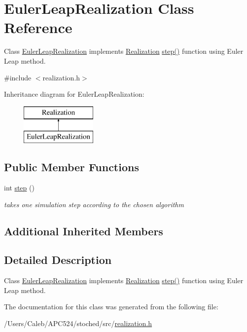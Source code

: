 \hypertarget{class_euler_leap_realization}{}\section{Euler\+Leap\+Realization Class Reference}
\label{class_euler_leap_realization}


Class \hyperlink{class_euler_leap_realization}{Euler\+Leap\+Realization} implements \hyperlink{class_realization}{Realization} \hyperlink{class_euler_leap_realization_ab72bfdc22d6101f2c10227b27a5121f1}{step()} function using Euler Leap method.  




{\ttfamily \#include $<$realization.\+h$>$}

Inheritance diagram for Euler\+Leap\+Realization\+:\begin{figure}[H]
\begin{center}
\leavevmode
\includegraphics[height=2.000000cm]{class_euler_leap_realization}
\end{center}
\end{figure}
\subsection*{Public Member Functions}
\begin{DoxyCompactItemize}
\item 
\mbox{\label{class_euler_leap_realization_ab72bfdc22d6101f2c10227b27a5121f1}} 
int \hyperlink{class_euler_leap_realization_ab72bfdc22d6101f2c10227b27a5121f1}{step} ()
\begin{DoxyCompactList}\small\item\em takes one simulation step according to the chosen algorithm \end{DoxyCompactList}\end{DoxyCompactItemize}
\subsection*{Additional Inherited Members}


\subsection{Detailed Description}
Class \hyperlink{class_euler_leap_realization}{Euler\+Leap\+Realization} implements \hyperlink{class_realization}{Realization} \hyperlink{class_euler_leap_realization_ab72bfdc22d6101f2c10227b27a5121f1}{step()} function using Euler Leap method. 

The documentation for this class was generated from the following file\+:\begin{DoxyCompactItemize}
\item 
/\+Users/\+Caleb/\+A\+P\+C524/stoched/src/\hyperlink{realization_8h}{realization.\+h}\end{DoxyCompactItemize}
